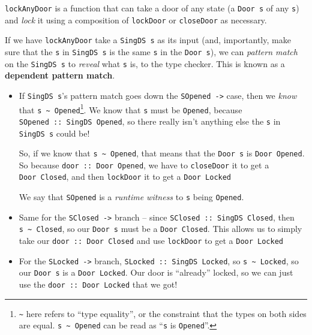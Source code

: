 \documentclass[]{article}
\begin{document}
\texttt{lockAnyDoor} is a function that can take a door of any state (a
\texttt{Door\ s} of any \texttt{s}) and \emph{lock} it using a composition of
\texttt{lockDoor} or \texttt{closeDoor} as necessary.

If we have \texttt{lockAnyDoor} take a \texttt{SingDS\ s} as its input (and,
importantly, make sure that the \texttt{s} in \texttt{SingDS\ s} is the same
\texttt{s} in the \texttt{Door\ s}), we can \emph{pattern match} on the
\texttt{SingDS\ s} to \emph{reveal} what \texttt{s} is, to the type checker.
This is known as a \textbf{dependent pattern match}.

\begin{itemize}
\item
  If \texttt{SingDS\ s}'s pattern match goes down the
  \texttt{SOpened\ -\textgreater{}} case, then we \emph{know} that
  \texttt{s\ \textasciitilde{}\ \textquotesingle{}Opened}\footnote{\texttt{\textasciitilde{}}
    here refers to ``type equality'', or the constraint that the types on both
    sides are equal. \texttt{s\ \textasciitilde{}\ \textquotesingle{}Opened} can
    be read as ``\texttt{s} is \texttt{\textquotesingle{}Opened}''.}. We know
  that \texttt{s} must be \texttt{\textquotesingle{}Opened}, because
  \texttt{SOpened\ ::\ SingDS\ \textquotesingle{}Opened}, so there really isn't
  anything else the \texttt{s} in \texttt{SingDS\ s} could be!

  So, if we know that \texttt{s\ \textasciitilde{}\ \textquotesingle{}Opened},
  that means that the \texttt{Door\ s} is
  \texttt{Door\ \textquotesingle{}Opened}. So because
  \texttt{door\ ::\ Door\textquotesingle{}\ Opened}, we have to
  \texttt{closeDoor} it to get a \texttt{Door\textquotesingle{}\ Closed}, and
  then \texttt{lockDoor} it to get a \texttt{Door\ \textquotesingle{}Locked}

  We say that \texttt{SOpened} is a \emph{runtime witness} to \texttt{s} being
  \texttt{\textquotesingle{}Opened}.
\item
  Same for the \texttt{SClosed\ -\textgreater{}} branch -- since
  \texttt{SClosed\ ::\ SingDS\ \textquotesingle{}Closed}, then
  \texttt{s\ \textasciitilde{}\ \textquotesingle{}Closed}, so our
  \texttt{Door\ s} must be a \texttt{Door\ \textquotesingle{}Closed}. This
  allows us to simply take our \texttt{door\ ::\ Door\ \textquotesingle{}Closed}
  and use \texttt{lockDoor} to get a \texttt{Door\ \textquotesingle{}Locked}
\item
  For the \texttt{SLocked\ -\textgreater{}} branch,
  \texttt{SLocked\ ::\ SingDS\ \textquotesingle{}Locked}, so
  \texttt{s\ \textasciitilde{}\ \textquotesingle{}Locked}, so our
  \texttt{Door\ s} is a \texttt{Door\ \textquotesingle{}Locked}. Our door is
  ``already'' locked, so we can just use the
  \texttt{door\ ::\ Door\ \textquotesingle{}Locked} that we got!
\end{itemize}
\end{document}
